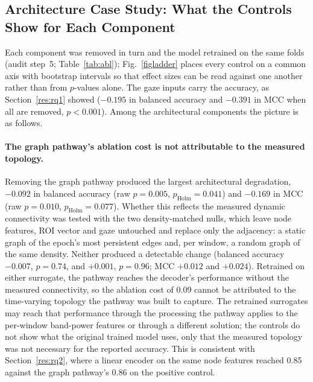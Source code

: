 \subsection{Architecture Case Study: What the Controls Show for Each Component}\label{res:rq3}

Each component was removed in turn and the model retrained on the same folds (audit step~5; Table~\ref{tab:abl}); Fig.~\ref{figladder} places every control on a common axis with bootstrap intervals so that effect sizes can be read against one another rather than from $p$-values alone. The gaze inputs carry the accuracy, as Section~\ref{res:rq1} showed ($-0.195$ in balanced accuracy and $-0.391$ in MCC when all are removed, $p<0.001$). Among the architectural components the picture is as follows.

\paragraph{The graph pathway's ablation cost is not attributable to the measured topology.} Removing the graph pathway produced the largest architectural degradation, $-0.092$ in balanced accuracy (raw $p=0.005$, $p_{\mathrm{Holm}}=0.041$) and $-0.169$ in MCC (raw $p=0.010$, $p_{\mathrm{Holm}}=0.077$). Whether this reflects the measured dynamic connectivity was tested with the two density-matched nulls, which leave node features, ROI vector and gaze untouched and replace only the adjacency: a static graph of the epoch's most persistent edges and, per window, a random graph of the same density. Neither produced a detectable change (balanced accuracy $-0.007$, $p=0.74$, and $+0.001$, $p=0.96$; MCC $+0.012$ and $+0.024$). Retrained on either surrogate, the pathway reaches the decoder's performance without the measured connectivity, so the ablation cost of 0.09 cannot be attributed to the time-varying topology the pathway was built to capture. The retrained surrogates may reach that performance through the processing the pathway applies to the per-window band-power features or through a different solution; the controls do not show what the original trained model uses, only that the measured topology was not necessary for the reported accuracy. This is consistent with Section~\ref{res:rq2}, where a linear encoder on the same node features reached 0.85 against the graph pathway's 0.86 on the positive control.

